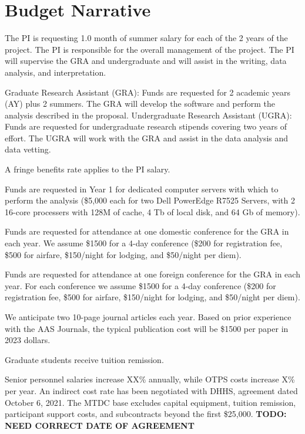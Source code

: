 \documentclass[12pt, preprint]{hacked-aastex}
\begin{document}
\printbibliography[title=~]

\clearpage
\section{Budget Narrative}\label{sec:budget}

The PI is requesting 1.0 month of summer salary for each
of the 2 years of the project. 
The PI is responsible for the overall management of the project. The PI will 
supervise the GRA and undergraduate and will assist in the writing,
data analysis, and interpretation.

Graduate Research Assistant (GRA): Funds are requested for 2 academic years
(AY) plus 2 summers. The GRA will develop the software and perform the
analysis described in the proposal. Undergraduate Research Assistant (UGRA): 
Funds  are requested for undergraduate research stipends covering two years of
effort. The UGRA will work with the GRA and assist in the data analysis 
and data vetting.

 A fringe benefits rate 
applies to the PI salary. %

 Funds are requested in Year 1 for 
dedicated computer  servers with which to perform the analysis (\$5,000 each
for two Dell PowerEdge R7525 Servers, with 2 16-core processers with 128M 
of cache, 4 Tb of local disk,  and 64 Gb of memory).

Funds are requested for attendance at one domestic conference for 
the GRA in each year. We assume \$1500 for a 
4-day conference (\$200 for registration fee, \$500 for airfare, \$150/night 
for lodging, and \$50/night per diem).

Funds are requested for attendance at one foreign conference for 
the GRA in each year. For each conference we assume \$1500 for a 
4-day conference (\$200 for registration fee, \$500 for airfare, \$150/night 
for lodging, and \$50/night per diem).

 We anticipate two 10-page journal articles each 
year. Based on prior experience with the AAS Journals, the typical 
publication  cost will be \$1500 per paper in 2023 dollars.

Graduate students receive tuition remission. %

Senior personnel salaries increase XX\% annually, while OTPS costs increase X\% per year. An indirect cost rate has been negotiated with DHHS, agreement dated October 6, 2021. The MTDC base excludes capital equipment, tuition remission, participant support costs, and subcontracts beyond the first \$25,000. {\bf TODO: NEED CORRECT DATE 
OF AGREEMENT}
\end{document}
